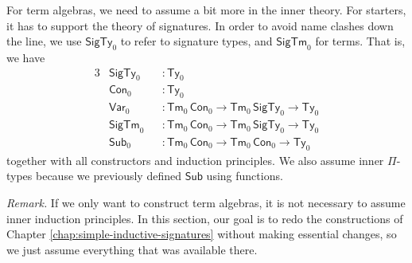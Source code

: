 \documentclass[12pt,a4paper,twoside,openany]{book}
\theoremstyle{remark}
\theoremstyle{definition}
\theoremstyle{theorem}
\newcommand{\ms}[1]{\mathsf{#1}}
\newcommand{\Con}{\mathsf{Con}}
\newcommand{\Sub}{\mathsf{Sub}}
\newcommand{\Tm}{\mathsf{Tm}}
\newcommand{\Ty}{\mathsf{Ty}}
\newcommand{\SigTy}{\mathsf{SigTy}}
\newcommand{\SigTm}{\mathsf{SigTm}}
\newcommand{\Var}{\ms{Var}}
\begin{document}
For term algebras, we need to assume a bit more in the inner theory. For
starters, it has to support the theory of signatures. In order to avoid name
clashes down the line, we use $\SigTy_0$ to refer to signature types, and
$\SigTm_0$ for terms. That is, we have
\begin{alignat*}{3}
  & \SigTy_0  &&: \Ty_0\\
  & \Con_0   &&: \Ty_0\\
  & \Var_0   &&: \Tm_0\,\Con_0 \to \Tm_0\,\SigTy_0 \to \Ty_0\\
  & \SigTm_0 &&: \Tm_0\,\Con_0 \to \Tm_0\,\SigTy_0 \to \Ty_0\\
  & \Sub_0   &&: \Tm_0\,\Con_0 \to \Tm_0\,\Con_0 \to \Ty_0
\end{alignat*}
together with all constructors and induction principles. We also assume inner
$\Pi$-types because we previously defined $\Sub$ using functions.

\emph{Remark.} If we only want to construct term algebras, it is not necessary
to assume inner induction principles. In this section, our goal is to redo the
constructions of Chapter \ref{chap:simple-inductive-signatures} without making
essential changes, so we just assume everything that was available there.
\end{document}
